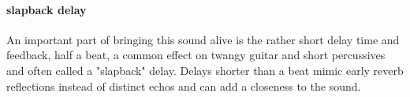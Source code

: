 \paragraph{slapback delay}
An important part of bringing this sound alive is the rather short
delay time and feedback, half a beat, a common effect on
twangy guitar and short percussives and often called a "slapback"
delay. Delays shorter than a beat mimic early reverb reflections
instead of distinct echos and can add a closeness to the sound.